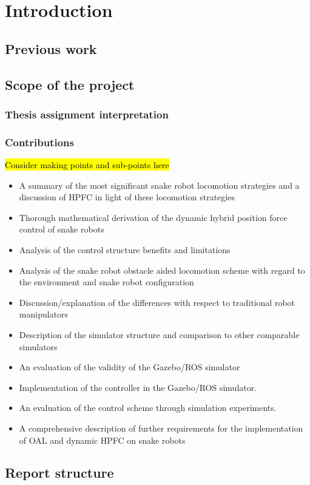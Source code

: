 
\chapter{Introduction}\label{Chapter:introduction}

\section{Previous work}

\section{Scope of the project}

\subsection{Thesis assignment interpretation}

\subsection{Contributions}

\hl{Consider making points and sub-points here}

\begin{itemize}
    \item A summary of the most significant snake robot locomotion strategies and a discussion of HPFC in light of these locomotion strategies
    \item Thorough mathematical derivation of the dynamic hybrid position force control of snake robots
    \item Analysis of the control structure benefits and limitations
    \item Analysis of the snake robot obstacle aided locomotion scheme with regard to the environment and snake robot configuration
    \item Discussion/explanation of the differences with respect to traditional robot manipulators
    \item Description of the simulator structure and comparison to other comparable simulators
    \item An evaluation of the validity of the Gazebo/ROS simulator
    \item Implementation of the controller in the Gazebo/ROS simulator.
    \item An evaluation of the control scheme through simulation experiments.
    \item A comprehensive description of further requirements for the implementation of OAL and dynamic HPFC on snake robots 
\end{itemize}


\section{Report structure}